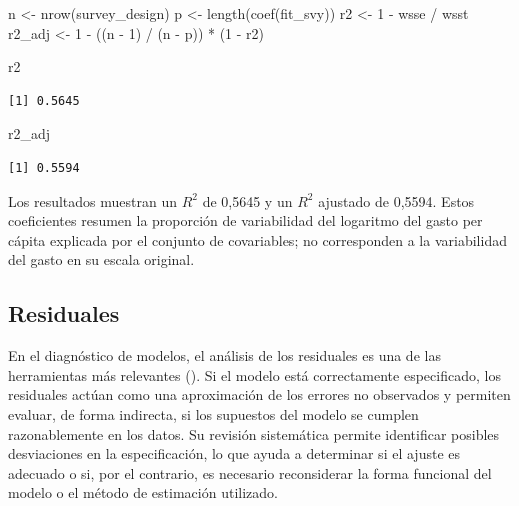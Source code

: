 \documentclass[
  spanish,
  11pt,
  letterpaper,
  oneside,
  open=any]{scrbook}
\newenvironment{Shaded}{\begin{snugshade}}{\end{snugshade}}
\newcommand{\DecValTok}[1]{\textcolor[rgb]{0.68,0.00,0.00}{#1}}
\newcommand{\FunctionTok}[1]{\textcolor[rgb]{0.28,0.35,0.67}{#1}}
\newcommand{\NormalTok}[1]{\textcolor[rgb]{0.00,0.23,0.31}{#1}}
\newcommand{\OtherTok}[1]{\textcolor[rgb]{0.00,0.23,0.31}{#1}}
\newcommand{\SpecialCharTok}[1]{\textcolor[rgb]{0.37,0.37,0.37}{#1}}
\begin{document}
\begin{Shaded}
\begin{Highlighting}[]
\NormalTok{n }\OtherTok{\textless{}{-}} \FunctionTok{nrow}\NormalTok{(survey\_design)}
\NormalTok{p }\OtherTok{\textless{}{-}} \FunctionTok{length}\NormalTok{(}\FunctionTok{coef}\NormalTok{(fit\_svy))}
\NormalTok{r2 }\OtherTok{\textless{}{-}} \DecValTok{1} \SpecialCharTok{{-}}\NormalTok{ wsse }\SpecialCharTok{/}\NormalTok{ wsst}
\NormalTok{r2\_adj }\OtherTok{\textless{}{-}} \DecValTok{1} \SpecialCharTok{{-}}\NormalTok{ ((n }\SpecialCharTok{{-}} \DecValTok{1}\NormalTok{) }\SpecialCharTok{/}\NormalTok{ (n }\SpecialCharTok{{-}}\NormalTok{ p)) }\SpecialCharTok{*}\NormalTok{ (}\DecValTok{1} \SpecialCharTok{{-}}\NormalTok{ r2)}

\NormalTok{r2}
\end{Highlighting}
\end{Shaded}

\begin{verbatim}
[1] 0.5645
\end{verbatim}

\begin{Shaded}
\begin{Highlighting}[]
\NormalTok{r2\_adj}
\end{Highlighting}
\end{Shaded}

\begin{verbatim}
[1] 0.5594
\end{verbatim}

Los resultados muestran un \(R^2\) de 0,5645 y un \(R^2\) ajustado de
0,5594. Estos coeficientes resumen la proporción de variabilidad del
logaritmo del gasto per cápita explicada por el conjunto de covariables;
no corresponden a la variabilidad del gasto en su escala original.

\subsection{Residuales}\label{residuales}

En el diagnóstico de modelos, el análisis de los residuales es una de
las herramientas más relevantes (). Si el modelo está correctamente especificado, los
residuales actúan como una aproximación de los errores no observados y
permiten evaluar, de forma indirecta, si los supuestos del modelo se
cumplen razonablemente en los datos. Su revisión sistemática permite
identificar posibles desviaciones en la especificación, lo que ayuda a
determinar si el ajuste es adecuado o si, por el contrario, es necesario
reconsiderar la forma funcional del modelo o el método de estimación
utilizado.
\end{document}

